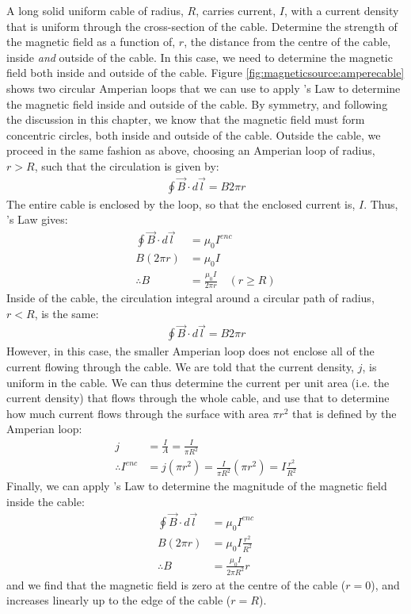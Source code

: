 \begin{example}{A long solid uniform cable of radius, $R$, carries current, $I$, with a current density that is uniform through the cross-section of the cable. Determine the strength of the magnetic field as a function of, $r$, the distance from the centre of the cable, inside \textit{and} outside of the cable.}
In this case, we need to determine the magnetic field both inside and outside of the cable. Figure \ref{fig:magneticsource:amperecable} shows two circular Amperian loops that we can use to apply \ampere's Law to determine the magnetic field inside and outside of the cable.
By symmetry, and following the discussion in this chapter, we know that the magnetic field must form concentric circles, both inside and outside of the cable. Outside the cable, we proceed in the same fashion as above, choosing an Amperian loop of radius, $r>R$, such that the circulation is given by:
\begin{align*}
\oint \vec B \cdot d\vec l= B 2\pi r
\end{align*}
The entire cable is enclosed by the loop, so that the enclosed current is, $I$. Thus, \ampere's Law gives:
\begin{align*}
\oint \vec B \cdot d\vec l &=\mu_0 I^{enc}\\
B (2\pi r) &= \mu_0 I\\
\therefore B &= \frac{\mu_0 I}{2\pi r}\quad(r\geq R)
\end{align*} 
Inside of the cable, the circulation integral around a circular path of radius, $r<R$, is the same:
\begin{align*}
\oint \vec B \cdot d\vec l= B 2\pi r
\end{align*}
However, in this case, the smaller Amperian loop does not enclose all of the current flowing through the cable. We are told that the current density, $j$, is uniform in the cable. We can thus determine the current per unit area (i.e. the current density) that flows through the whole cable, and use that to determine how much current flows through the surface with area $\pi r^2$ that is defined by the Amperian loop:
\begin{align*}
j &= \frac{I}{A}=\frac{I}{\pi R^2}\\
\therefore I^{enc} &= j(\pi r^2) = \frac{I}{\pi R^2}(\pi r^2)=I\frac{r^2}{R^2}
\end{align*}
Finally, we can apply \ampere's Law to determine the magnitude of the magnetic field inside the cable:
\begin{align*}
\oint \vec B \cdot d\vec l &=\mu_0 I^{enc}\\
B (2\pi r) &= \mu_0 I\frac{r^2}{R^2}\\
\therefore B &= \frac{\mu_0 I}{2\pi R^2}r
\end{align*}
and we find that the magnetic field is zero at the centre of the cable ($r=0$), and increases linearly up to the edge of the cable ($r=R$).


\end{example}
